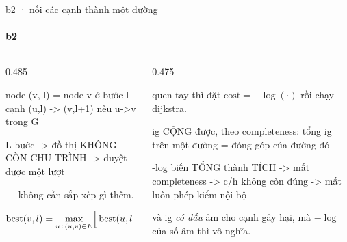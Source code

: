 \begin{frame}[fragile]{b2 · nối các cạnh thành một đường}
  \framesubtitle{b2}

  \begin{columns}[t]
  \begin{column}{0.485\textwidth}
    \begin{bx}[title={trải phẳng}]
      \begin{dia}
node (v, l)  =  node v ở bước l
cạnh (u,l) -> (v,l+1)  nếu u->v trong G

L bước  ->  đồ thị KHÔNG CÒN CHU TRÌNH
        ->  duyệt được một lượt
      \end{dia}
      \vspace{0.2em}
       — không cần sắp xếp gì thêm.
    \end{bx}
    \begin{bx}[title={một lượt quét là xong}]
      \[ \mathrm{best}(v, l) = \max_{u \,:\, (u,v) \in E}
         \Bigl[\, \mathrm{best}(u, l-1) + \mathrm{ig}_{(u,v)}^{(l)} \,\Bigr] \]
    \end{bx}
  \end{column}
  \begin{column}{0.475\textwidth}
    \begin{badb}[title={cộng điểm, KHÔNG phải tìm đường ngắn nhất}]
      quen tay thì đặt $\mathrm{cost} = -\log(\cdot)$ rồi chạy dijkstra.
      \vspace{0.3em}

      \begin{dia}
ig CỘNG được, theo completeness:
   tổng ig trên một đường
   = đóng góp của đường đó

-log biến TỔNG thành TÍCH
   -> mất completeness
   -> c/h không còn đúng
   -> mất luôn phép kiểm nội bộ
      \end{dia}
      \vspace{0.2em}
      và ig \emph{có dấu} âm cho cạnh gây hại, mà $-\log$ của số âm thì vô nghĩa.
    \end{badb}
  \end{column}
  \end{columns}
\end{frame}

